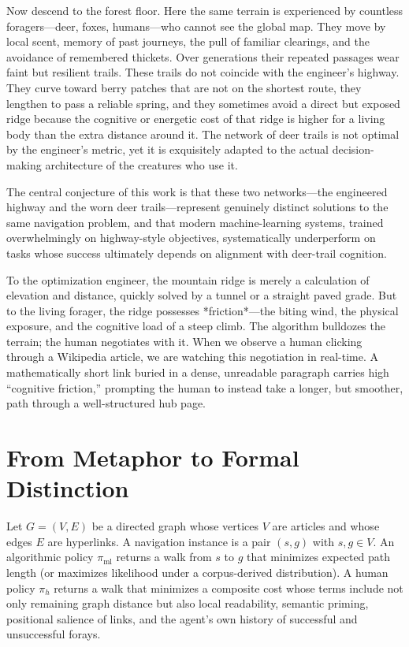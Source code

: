 \documentclass[11pt,a4paper]{report}
\begin{document}
Now descend to the forest floor. Here the same terrain is experienced by countless foragers—deer, foxes, humans—who cannot see the global map. They move by local scent, memory of past journeys, the pull of familiar clearings, and the avoidance of remembered thickets. Over generations their repeated passages wear faint but resilient trails. These trails do not coincide with the engineer’s highway. They curve toward berry patches that are not on the shortest route, they lengthen to pass a reliable spring, and they sometimes avoid a direct but exposed ridge because the cognitive or energetic cost of that ridge is higher for a living body than the extra distance around it. The network of deer trails is not optimal by the engineer’s metric, yet it is exquisitely adapted to the actual decision-making architecture of the creatures who use it.

The central conjecture of this work is that these two networks—the engineered highway and the worn deer trails—represent genuinely distinct solutions to the same navigation problem, and that modern machine-learning systems, trained overwhelmingly on highway-style objectives, systematically underperform on tasks whose success ultimately depends on alignment with deer-trail cognition.

To the optimization engineer, the mountain ridge is merely a calculation of elevation and distance, quickly solved by a tunnel or a straight paved grade. But to the living forager, the ridge possesses *friction*—the biting wind, the physical exposure, and the cognitive load of a steep climb. The algorithm bulldozes the terrain; the human negotiates with it. When we observe a human clicking through a Wikipedia article, we are watching this negotiation in real-time. A mathematically short link buried in a dense, unreadable paragraph carries high ``cognitive friction,'' prompting the human to instead take a longer, but smoother, path through a well-structured hub page.

\section{From Metaphor to Formal Distinction}

Let \(G = (V, E)\) be a directed graph whose vertices \(V\) are articles and whose edges \(E\) are hyperlinks. A navigation instance is a pair \((s, g)\) with \(s, g \in V\). An algorithmic policy \(\pi_{\text{ml}}\) returns a walk from \(s\) to \(g\) that minimizes expected path length (or maximizes likelihood under a corpus-derived distribution). A human policy \(\pi_h\) returns a walk that minimizes a composite cost whose terms include not only remaining graph distance but also local readability, semantic priming, positional salience of links, and the agent’s own history of successful and unsuccessful forays.
\end{document}

